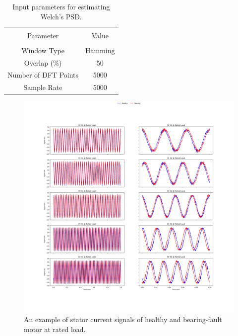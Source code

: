 \begin{table}[h]
	{\setlength{\tabcolsep}{12pt}
		\caption{Input parameters for estimating Welch's PSD.}
		\begin{center}
			\vspace{-6mm}
			\begin{tabular}{cc}
				\hline \\[-2.45ex] \hline \\[-2.1ex]
				Parameter & Value  \\
				\hline \\[-1.8ex]
				Window Type & Hamming    \\
				Overlap (\%) & 50 \\
				Number of DFT Points & 5000  \\
				Sample Rate & 5000    \\
				\hline
			\end{tabular}
			\vspace{-6mm}
		\end{center}
		\label{Table3.4}}
\end{table}
\pagebreak
\begin{figure}[h]
	\centering
	\includegraphics[width=0.8\paperwidth,keepaspectratio=true]{./fig/bearing_100.png}
	\caption{An example of stator current signals of healthy and bearing-fault motor at rated load.}	
	\label{bearing100}
\end{figure}

